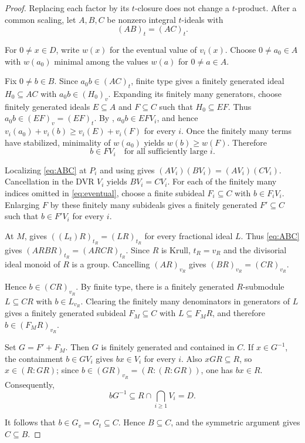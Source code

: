 \documentclass[11pt]{amsart}
\theoremstyle{definition}
\theoremstyle{remark}
\begin{document}
\begin{proof}
Replacing each factor by its $t$-closure does not change a $t$-product.
After a common scaling, let $A,B,C$ be nonzero integral $t$-ideals with
\begin{equation}\label{eq:ABC}
 (AB)_t=(AC)_t.
\end{equation}

For $0\ne x\in D$, write $w(x)$ for the eventual value of $v_i(x)$.  Choose
$0\ne a_0\in A$ with $w(a_0)$ minimal among the values $w(a)$ for
$0\ne a\in A$.

Fix $0\ne b\in B$.  Since $a_0b\in(AC)_t$, finite type gives a finitely
generated ideal $H_0\subseteq AC$ with $a_0b\in(H_0)_v$.  Expanding its
finitely many generators, choose finitely generated ideals $E\subseteq A$ and
$F\subseteq C$ such that $H_0\subseteq EF$.  Thus
$a_0b\in(EF)_v=(EF)_t$.  By ,
$a_0b\in EFV_i$, and hence
$v_i(a_0)+v_i(b)\geq v_i(E)+v_i(F)$ for every $i$.  Once the finitely many
terms have stabilized, minimality of $w(a_0)$ yields $w(b)\geq w(F)$.
Therefore
\begin{equation}\label{eq:eventual}
 b\in FV_i\quad\text{for all sufficiently large }i.
\end{equation}

Localizing \eqref{eq:ABC} at $P_i$ and using
 gives
$(AV_i)(BV_i)=(AV_i)(CV_i)$.  Cancellation in the DVR $V_i$ yields
$BV_i=CV_i$.  For each of the finitely many indices omitted in
\eqref{eq:eventual}, choose a finite subideal $F_i\subseteq C$ with
$b\in F_iV_i$.  Enlarging $F$ by these finitely many subideals gives a
finitely generated $F'\subseteq C$ such that $b\in F'V_i$ for every $i$.

At $M$,  gives
$((L_t)R)_{t_R}=(LR)_{t_R}$ for every fractional ideal $L$.  Thus \eqref{eq:ABC} gives
$(ARBR)_{t_R}=(ARCR)_{t_R}$.  Since $R$ is Krull,
$t_R=v_R$ and the divisorial ideal monoid of $R$ is a group.  Cancelling
$(AR)_{v_R}$ gives $(BR)_{v_R}=(CR)_{v_R}$.

Hence $b\in(CR)_{v_R}$.  By finite type, there is a finitely generated
$R$-submodule $L\subseteq CR$ with $b\in L_{v_R}$.  Clearing the finitely
many denominators in generators of $L$ gives a finitely generated subideal
$F_M\subseteq C$ with $L\subseteq F_MR$, and therefore
$b\in(F_MR)_{v_R}$.

Set $G=F'+F_M$.  Then $G$ is finitely generated and contained in $C$.  If
$x\in G^{-1}$, the containment $b\in GV_i$ gives $bx\in V_i$ for every $i$.
Also $xGR\subseteq R$, so $x\in(R:GR)$; since
$b\in(GR)_{v_R}=(R:(R:GR))$, one has $bx\in R$.  Consequently,
\begin{equation}\label{eq:intersection}
 bG^{-1}\subseteq R\cap\bigcap_{i\geq1}V_i=D.
\end{equation}

It follows that $b\in G_v=G_t\subseteq C$.  Hence $B\subseteq C$, and the
symmetric argument gives $C\subseteq B$.
\end{proof}
\end{document}
